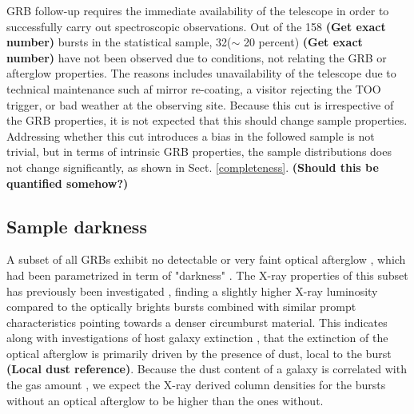\documentclass{aa}    %
\newcommand\todo[1]{\textbf{(#1)}}
\begin{document}
GRB follow-up requires the immediate availability of the telescope in order to
successfully carry out spectroscopic observations. Out of the 158 \todo{Get
exact number} bursts in the statistical sample, 32($\sim$ 20 percent) \todo{Get
exact number} have not been observed due to conditions, not relating the GRB or
afterglow properties. The reasons includes unavailability of the telescope due
to technical maintenance such af mirror re-coating, a visitor rejecting the TOO
trigger, or bad weather at the observing site. Because this cut is irrespective
of the GRB properties, it is not expected that this should change sample
properties. Addressing whether this cut introduces a bias in the followed sample
is not trivial, but in terms of intrinsic GRB properties, the sample
distributions does not change significantly, as shown in Sect. \ref{completeness}.
\todo{Should this be quantified somehow?}

\subsection{Sample darkness}

A subset of all GRBs exhibit no detectable or very faint optical afterglow
\citep{Groot1998, Djorgovski2001, Fynbo2001}, which had been parametrized in
term of "darkness" \citep{Jakobsson2004, VanderHorst2009}. The X-ray properties
of this subset has previously been investigated \citep{DePasquale2003, Fynbo2009,
	Melandri2012}, finding a slightly higher X-ray luminosity compared to the
optically brights bursts combined with similar prompt characteristics pointing
towards a denser circumburst material. This indicates along with investigations
of host galaxy extinction \citep{Greiner2011, Kruhler2011, Hjorth2012}, that the
extinction of the optical afterglow is primarily driven by the presence of dust,
local to the burst \todo{Local dust reference}. Because the dust content of a
galaxy is correlated with the gas amount \citep{Bohlin1978, Guver2009}, we
expect the X-ray derived column densities for the bursts without an optical
afterglow to be higher than the ones without.
\end{document}

